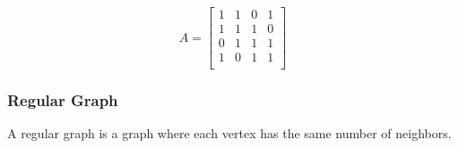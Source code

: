 \documentclass{beamer}
\begin{document}
\begin{frame}
\begin{multicols}{2}
\begin{figure}[h!]
                                    \begin{equation*}
                                                A = \begin{bmatrix}
                                                      1 & 1 & 0 & 1 \\
                                                      1 & 1 & 1 & 0 \\
                                                      0 & 1 & 1 & 1 \\
                                                      1 & 0 & 1 & 1 \\
                                                \end{bmatrix}
                                    \end{equation*}
                              \end{figure}
                        \end{multicols}
                  \end{frame}

                  \begin{frame}
                        \frametitle{Regular Graph}
                        \begin{definition}
                              A regular graph is a graph where each vertex has the same number of neighbors.
                        \end{definition}
                  \end{frame}
            
\end{document}
